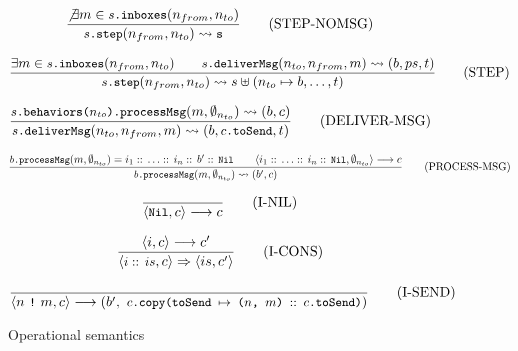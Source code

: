 \documentclass[a4paper,twoside]{article}
\newcommand{\stt}[1]{\texttt{\small{#1}}}
\begin{document}
\begin{figure}[!h]
\begin{framed}
 
\begin{equation}
\dfrac{
  \not\exists m \in \stt{$s$.inboxes}(n_{from}, n_{to})
}{
  \stt{$s$.step}(n_{from}, n_{to}) \leadsto \stt{s}
}
\tag{STEP-NOMSG}
\end{equation}

\vspace{10pt}
\begin{equation}
\dfrac{
  \exists m \in \stt{$s$.inboxes}(n_{from}, n_{to}) \qquad
  \stt{$s$.deliverMsg}(n_{to}, n_{from}, m) \leadsto (b, ps, t)
}{
  \stt{$s$.step}(n_{from}, n_{to}) \leadsto s \uplus (n_{to} \mapsto b, \ldots, t)
}
\tag{STEP}
\end{equation}

\vspace{10pt}
\begin{equation}
\dfrac{
  \stt{$s$.behaviors($n_{to}$).processMsg}(m, \emptyset_{n_{to}}) \leadsto (b, c) 
}{
  \stt{$s$.deliverMsg}(n_{to}, n_{from}, m) \leadsto (b, \stt{$c$.toSend}, t)
}
\tag{DELIVER-MSG}
\end{equation}

\vspace{10pt}
\begin{equation}
\dfrac{
  \stt{$b$.processMsg}(m, \emptyset_{n_{to}}) = i_1 ::\, \ldots ::\,i_n ::\, b' ::\,\stt{Nil} \qquad
  \langle i_1 ::\, \ldots ::\,i_n ::\,\stt{Nil}, \emptyset_{n_{to}} \rangle \longrightarrow c
}{
   \stt{$b$.processMsg}(m, \emptyset_{n_{to}}) \leadsto (b', c)
}
\tag{PROCESS-MSG}
\end{equation}

\vspace{10pt}
\begin{equation}
\dfrac{\empty}{
   \langle \stt{Nil}, c \rangle \longrightarrow c
}
\tag{I-NIL}
\end{equation}

\vspace{10pt}
\begin{equation}
\dfrac{
  \langle i, c \rangle \longrightarrow c'
}{
  \langle \stt{$i ::\,is$}, c \rangle \Rightarrow \langle is, c' \rangle
}
\tag{I-CONS}
\end{equation}

\vspace{10pt}
\begin{equation}
\dfrac{
  \empty
}{
  \langle n\ \stt{!}\ m, c \rangle \longrightarrow (b',\ \stt{$c$.copy(toSend $\mapsto$ ($n$, $m$) $::$ $c$.toSend)})
}
\tag{I-SEND}
\end{equation}

\end{framed}
\vspace{-10pt}
\caption{Operational semantics\label{fig:opsem}}
\end{figure}
\end{document}
